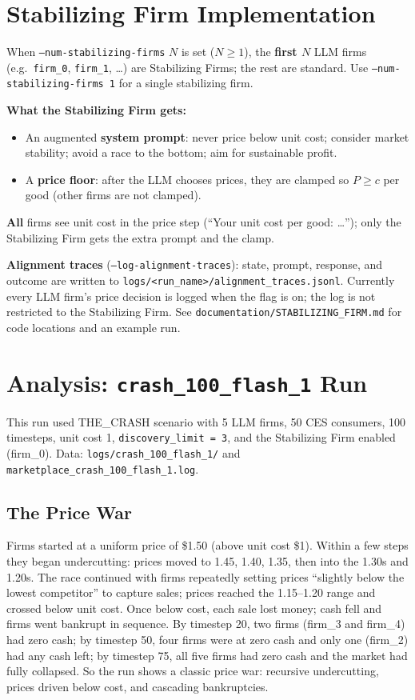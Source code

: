 \documentclass{article}
\begin{document}
\section{Stabilizing Firm Implementation}

When \texttt{--num-stabilizing-firms} $N$ is set ($N \geq 1$), the \textbf{first $N$} LLM firms (e.g.\ \texttt{firm\_0}, \texttt{firm\_1}, \ldots) are Stabilizing Firms; the rest are standard. Use \texttt{--num-stabilizing-firms 1} for a single stabilizing firm.

\textbf{What the Stabilizing Firm gets:}
\begin{itemize}
    \item An augmented \textbf{system prompt}: never price below unit cost; consider market stability; avoid a race to the bottom; aim for sustainable profit.
    \item A \textbf{price floor}: after the LLM chooses prices, they are clamped so \(P \geq c\) per good (other firms are not clamped).
\end{itemize}

\textbf{All} firms see unit cost in the price step (``Your unit cost per good: \ldots''); only the Stabilizing Firm gets the extra prompt and the clamp.

\textbf{Alignment traces} (\texttt{--log-alignment-traces}): state, prompt, response, and outcome are written to \texttt{logs/<run\_name>/alignment\_traces.jsonl}. Currently every LLM firm's price decision is logged when the flag is on; the log is not restricted to the Stabilizing Firm. See \texttt{documentation/STABILIZING\_FIRM.md} for code locations and an example run.

\section{Analysis: \texttt{crash\_100\_flash\_1} Run}

This run used THE\_CRASH scenario with 5 LLM firms, 50 CES consumers, 100 timesteps, unit cost 1, \texttt{discovery\_limit = 3}, and the Stabilizing Firm enabled (firm\_0). Data: \texttt{logs/crash\_100\_flash\_1/} and \texttt{marketplace\_crash\_100\_flash\_1.log}.

\subsection{The Price War}

Firms started at a uniform price of \$1.50 (above unit cost \$1). Within a few steps they began undercutting: prices moved to 1.45, 1.40, 1.35, then into the 1.30s and 1.20s. The race continued with firms repeatedly setting prices ``slightly below the lowest competitor'' to capture sales; prices reached the 1.15--1.20 range and crossed below unit cost. Once below cost, each sale lost money; cash fell and firms went bankrupt in sequence. By timestep 20, two firms (firm\_3 and firm\_4) had zero cash; by timestep 50, four firms were at zero cash and only one (firm\_2) had any cash left; by timestep 75, all five firms had zero cash and the market had fully collapsed. So the run shows a classic price war: recursive undercutting, prices driven below cost, and cascading bankruptcies.
\end{document}
